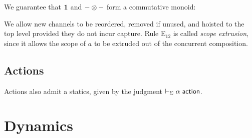\documentclass[11pt]{article}
\newcounter{infercount}
\newcommand{\infern}[2]{will be shadowed}
\begin{document}
We guarantee that $\textbf{1}$ and ${-}\mathbin{\otimes}{-}$ form a commutative monoid:

We allow new channels to be reordered, removed if unused, and hoisted to the top level provided they do not incur capture.
Rule E$_{12}$ is called \emph{scope extrusion}, since it allows the scope of $a$ to be extruded out of the concurrent composition.


\subsection{Actions}

Actions also admit a statics, given by the judgment $\actionabt{\alpha}{\Sigma}$.

\setcounter{infercount}{1}
\renewcommand{\infern}[2]{\inferrule{#1}{#2}(\text{A}_{\arabic{infercount}})}
\fbox{$\actionabt{\alpha}{\Sigma}$}


\section{Dynamics}\label{sec:dynamics}
\end{document}
